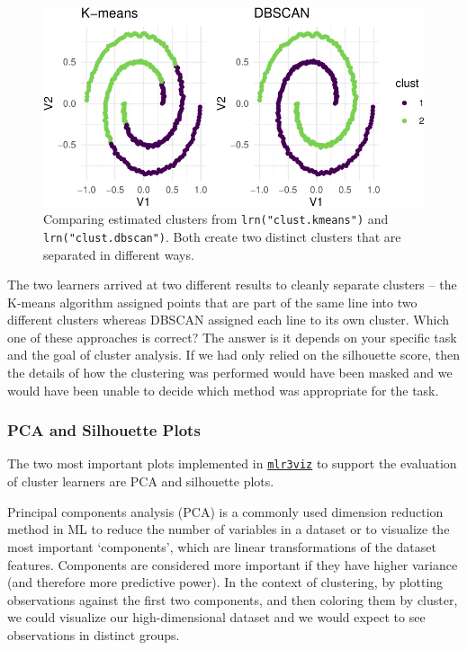 \begin{figure}[H]

{\centering \includegraphics[width=1\textwidth,height=\textheight]{chapters/chapter13/beyond_regression_and_classification_files/figure-pdf/fig-beyond-clust-spirals-pred-1.pdf}

}

\caption{\label{fig-beyond-clust-spirals-pred}Comparing estimated
clusters from \texttt{lrn("clust.kmeans")} and
\texttt{lrn("clust.dbscan")}. Both create two distinct clusters that are
separated in different ways.}

\end{figure}

The two learners arrived at two different results to cleanly separate
clusters -- the K-means algorithm assigned points that are part of the
same line into two different clusters whereas DBSCAN assigned each line
to its own cluster. Which one of these approaches is correct? The answer
is it depends on your specific task and the goal of cluster analysis. If
we had only relied on the silhouette score, then the details of how the
clustering was performed would have been masked and we would have been
unable to decide which method was appropriate for the task.

\hypertarget{pca-and-silhouette-plots}{%
\subsubsection{PCA and Silhouette
Plots}\label{pca-and-silhouette-plots}}

The two most important plots implemented in
\href{https://mlr3viz.mlr-org.com}{\texttt{mlr3viz}}
to support the evaluation of cluster learners are PCA and silhouette
plots.

Principal components analysis (PCA)
is a commonly used dimension reduction method in ML to reduce the number
of variables in a dataset or to visualize the most important
`components', which are linear transformations of the dataset features.
Components are considered more important if they have higher variance
(and therefore more predictive power). In the context of clustering, by
plotting observations against the first two components, and then
coloring them by cluster, we could visualize our high-dimensional
dataset and we would expect to see observations in distinct groups.

